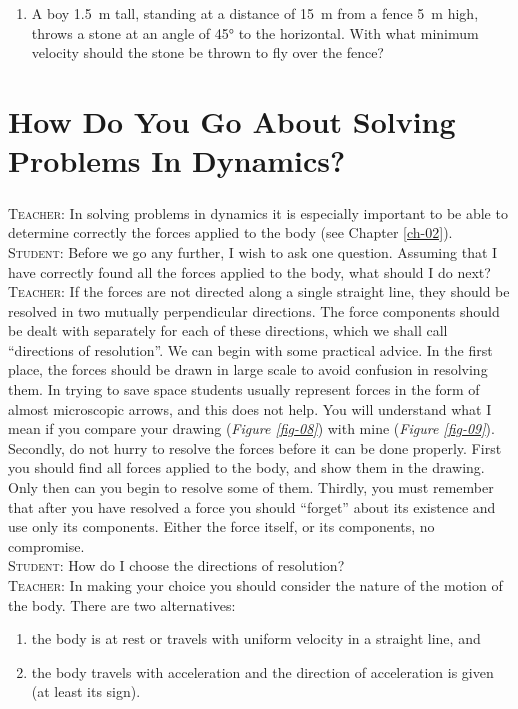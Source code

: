 \documentclass[a4paper,sfsidenotes]{tufte-book}
\begin{document}
\begin{enumerate}[series=problems]
\item A boy \SI{1.5}{m} tall, standing at a distance of \SI{15}{m} from a fence \SI{5}{m}
high, throws a stone at an angle of \ang{45} to the horizontal. With what minimum velocity should the stone be thrown to fly over the fence?
\end{enumerate}


\chapter{How Do You Go About Solving Problems In Dynamics?}
\label{ch-06}
\paragraph{}
\textsc{Teacher:} In solving problems in dynamics it is especially important to be able to determine correctly the forces applied to the body (see Chapter \ref{ch-02}).
\\
\textsc{Student:} Before we go any further, I wish to ask one question. Assuming that I have correctly found all the forces applied to the body, what should I do next?
\\
\textsc{Teacher:} If the forces are not directed along a single straight line, they should be resolved in two mutually perpendicular directions. The force components should be dealt with separately for each of these directions, which we shall call ``directions of resolution''. We can begin with some practical advice. In the first place, the forces should be drawn in large scale to avoid confusion in resolving them. In trying to save space students usually represent forces in the form of almost microscopic arrows, and this does not help. You will understand what I mean if you compare your drawing (\emph{Figure \ref{fig-08}}) with mine (\emph{Figure \ref{fig-09}}). Secondly, do not hurry to resolve the forces before it can be done properly. First you should find all forces applied to the body, and show them in the drawing. Only then can you begin to resolve some of them. Thirdly, you must remember that after you have resolved a force you should ``forget'' about its existence and use only its components. Either the force itself, or its components, no compromise.
\\
\textsc{Student:} How do I choose the directions of resolution?
\\
\textsc{Teacher:} In making your choice you should consider the nature of the motion of the body. There are two alternatives:
\begin{enumerate}[label=(\arabic*)]
\item the body is at rest or travels with uniform velocity in a straight line, and 
\item the body travels with acceleration and the direction of acceleration is given (at least its sign).
\end{enumerate}
\end{document}
